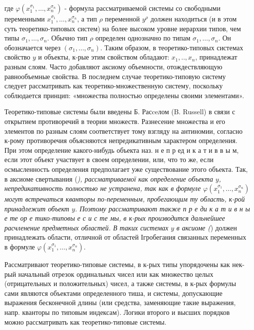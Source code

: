 \documentclass[10pt]{article}
\begin{document}
где $\varphi\left(x_{1}^{\sigma_{1}}, \ldots, x_{n}^{\sigma_{n}}\right)$ - формула рассматриваемой системы со свободными переменными $x_{1}^{\sigma_{1}}, \ldots, x_{n}^{\sigma_{n}}$, а тип $\rho$ переменной $y^{\rho}$ должен находиться (и в этом суть теоретико-типовых систем) на более высоком уровне иерархии типов, чем типы $\sigma_{1}, \ldots, \sigma_{n}$. Обычно тип $\rho$ определен однозначно по типам $\sigma_{1}, \ldots, \sigma_{n}$. Он обозначается через $\left(\sigma_{1}, \ldots, \sigma_{n}\right)$. Таким образом, в теоретико-типовых системах свойство $y$ и объекты, к-рые этим свойством обладают: $x_{1}, . ., x_{n}$, принадлежат разным слоям. Часто добавляют аксиому объемности, отождествляющую равнообъемные свойства. В последнем случае теоретико-типовую систему следует рассматривать как теоретико-множественную систему, поскольку соблюдается принцип: «множества полностью определены своими элементами».



Теоретико-типовые системы были введены Б. Расceлом (B. Russell) в связи с открытием противоречий в теории множеств. Разнесение множества и его элементов по разным слоям соответствует тому взгляду на антиномии, согласно к-рому противоречия объясняются непредикативным характером определения. При этом определение какого-нибудь объекта наз. н е п р ед и к а т и в в ы м, если этот объект участвует в своем определении, или, что то же, если осмысленность определения предполагает уже существование этого объекта. Так, в аксиоме свертывания (\textit{), рассматриваемої как определение объекта $y$, непредикативность полностью не устранена, так как в формуле $\varphi\left(x_{1}^{\sigma_{1}}, \ldots, x_{n}^{\sigma_{n}}\right)$ могут встречаться кванторы по-переменным, пробегающим ту область, к-рой принадлежит объект $y$. Поэтому рассматривают также п р е ди к а т и в н ы е те ор е тико-типовы е с и с те мы, в к-рых производится дальнейшее расчленение предметных областей. В таких системах $y$ в аксиоме (}) должен принадлежать области, отличной от областей Ігробегания связанных переменных в формуле $\varphi\left(x_{1}^{\sigma_{1}}, \ldots, x_{n}^{\sigma_{n}}\right)$.



Рассматривают теоретико-типовые системы, в к-рых типы упорядочены как нек-рый начальный отрезок ординальных чисел или как множество целых (отрицательных и положительных) чисел, а также системы, в к-рых формулы сами являются объектами определенного тиша, и системы, допускающие выражения бесконечной длины (или средства, заменяющие такие выражения, напр. кванторы по типовым индексам). Логики второго и высших порядков можно рассматривать как теоретико-типовые системы.
\end{document}
